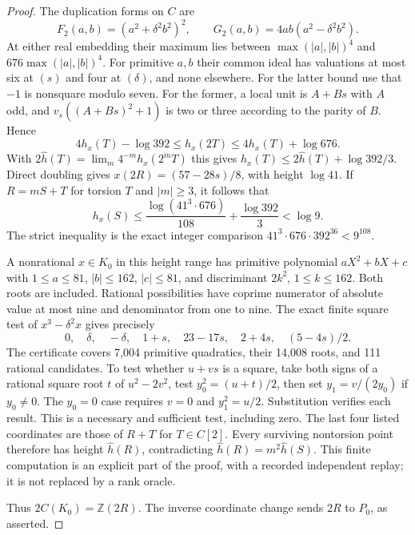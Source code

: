\documentclass[11pt]{article}
\theoremstyle{definition}
\theoremstyle{remark}
\newcommand{\Z}{\mathbb Z}
\begin{document}
\begin{proof}
The duplication forms on $C$ are
\[
 F_2(a,b)=(a^2+\delta^2b^2)^2,\qquad
 G_2(a,b)=4ab(a^2-\delta^2b^2).
\]
At either real embedding their maximum lies between
$\max(|a|,|b|)^4$ and $676\max(|a|,|b|)^4$. For primitive $a,b$ their
common ideal has valuations at most six at $(s)$ and four at $(\delta)$,
and none elsewhere. For the latter bound use that $-1$ is nonsquare
modulo seven. For the former, a local unit is $A+Bs$ with $A$ odd, and
$v_s((A+Bs)^2+1)$ is two or three according to the parity of $B$.
Hence
\[
 4h_x(T)-\log392\le h_x(2T)\le4h_x(T)+\log676.
\]
With $2\widehat h(T)=\lim_m4^{-m}h_x(2^mT)$ this gives
$h_x(T)\le2\widehat h(T)+\log392/3$. Direct doubling gives
$x(2R)=(57-28s)/8$, with height $\log41$. If $R=mS+T$ for torsion
$T$ and $|m|\ge3$, it follows that
\[
 h_x(S)\le\frac{\log(41^3\cdot676)}{108}+\frac{\log392}{3}<\log9.
\]
The strict inequality is the exact integer comparison
$41^3\cdot676\cdot392^{36}<9^{108}$.

A nonrational $x\in K_0$ in this height range has primitive polynomial
$aX^2+bX+c$ with $1\le a\le81$, $|b|\le162$, $|c|\le81$, and
discriminant $2k^2$, $1\le k\le162$. Both roots are included.
Rational possibilities have coprime numerator of absolute value at most
nine and denominator from one to nine. The exact finite square test of
$x^3-\delta^2x$ gives precisely
\[
 0,\quad\delta,\quad-\delta,\quad1+s,\quad23-17s,
 \quad2+4s,\quad(5-4s)/2.
\]
The certificate covers 7,004 primitive quadratics, their 14,008 roots,
and 111 rational candidates. To test whether $u+vs$ is a square, take
both signs of a rational square root $t$ of $u^2-2v^2$, test
$y_0^2=(u+t)/2$, then set $y_1=v/(2y_0)$ if $y_0\ne0$.
The $y_0=0$ case requires $v=0$ and $y_1^2=u/2$. Substitution verifies
each result. This is a necessary and sufficient test, including zero.
The last four listed coordinates are those of $R+T$ for $T\in C[2]$.
Every surviving nontorsion point therefore has height $\widehat h(R)$,
contradicting $\widehat h(R)=m^2\widehat h(S)$. This finite computation
is an explicit part of the proof, with a recorded independent replay;
it is not replaced by a rank oracle.

Thus $2C(K_0)=\Z(2R)$. The inverse coordinate change sends $2R$ to
$P_0$, as asserted.
\end{proof}
\end{document}
